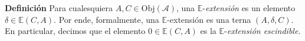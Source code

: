 \documentclass[preview]{standalone}
\begin{document}
\begin{center}
\justifying \textbf{Definición} Para cualesquiera $A,C\in\text{Obj}(\mathscr{A})$, una $\mathbb{E}$-\emph{extensión} es un elemento $\delta\in\mathbb{E}(C,A)$. Por ende, formalmente, una $\mathbb{E}$-extensión es una terna $(A,\delta,C)$. En particular, decimos que el elemento $0\in\mathbb{E}(C,A)$ es la $\mathbb{E}$-\emph{extensión escindible}.
\end{center}
\end{document}
